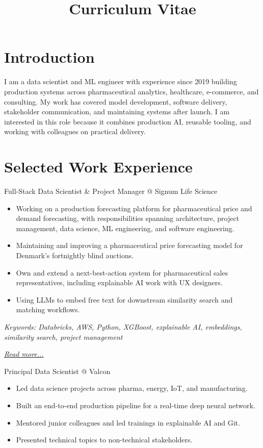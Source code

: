\documentclass[11pt,a4paper]{moderncv}
\title{Curriculum Vitae}
\begin{document}
\makecvtitle

\section*{Introduction}
I am a data scientist and ML engineer with experience since 2019 building production systems across pharmaceutical analytics, healthcare, e-commerce, and consulting. My work has covered model development, software delivery, stakeholder communication, and maintaining systems after launch. I am interested in this role because it combines production AI, reusable tooling, and working with colleagues on practical delivery.

\section{Selected Work Experience}

\large{Full-Stack Data Scientist \& Project Manager @ Signum Life Science}
\normalsize
\begin{itemize}
    \item Working on a production forecasting platform for pharmaceutical price and demand forecasting, with responsibilities spanning architecture, project management, data science, ML engineering, and software engineering.
    \item Maintaining and improving a pharmaceutical price forecasting model for Denmark's fortnightly blind auctions.
    \item Own and extend a next-best-action system for pharmaceutical sales representatives, including explainable AI work with UX designers.
    \item Using LLMs to embed free text for downstream similarity search and matching workflows.
\end{itemize}

{\footnotesize\textit{Keywords: Databricks, AWS, Python, XGBoost, explainable AI, embeddings, similarity search, project management}}

\hfill{\small{\textit{\hyperref[sec:signum]{Read more...}}}}

\large{Principal Data Scientist @ Valcon}
\normalsize
\begin{itemize}
    \item Led data science projects across pharma, energy, IoT, and manufacturing.
    \item Built an end-to-end production pipeline for a real-time deep neural network.
    \item Mentored junior colleagues and led trainings in explainable AI and Git.
    \item Presented technical topics to non-technical stakeholders.
\end{itemize}
\end{document}
